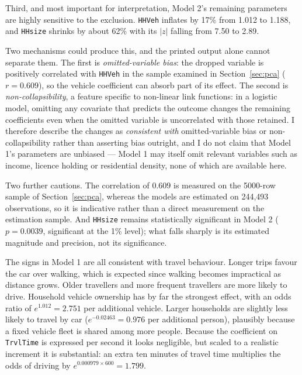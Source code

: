 \documentclass[11pt,a4paper]{article}
\newcommand{\code}[1]{\texttt{#1}}
\begin{document}
Third, and most important for interpretation, Model 2's remaining parameters are highly
sensitive to the exclusion. \code{HHVeh} inflates by 17\% from 1.012 to 1.188, and
\code{HHsize} shrinks by about 62\% with its $|z|$ falling from 7.50 to 2.89.

Two mechanisms could produce this, and the printed output alone cannot separate them. The
first is \emph{omitted-variable bias}: the dropped variable is positively correlated with
\code{HHVeh} in the sample examined in Section~\ref{sec:pca} ($r = 0.609$), so the vehicle
coefficient can absorb part of its effect. The second is \emph{non-collapsibility}, a
feature specific to non-linear link functions: in a logistic model, omitting any covariate
that predicts the outcome changes the remaining coefficients even when the omitted variable
is uncorrelated with those retained. I therefore describe the changes as \emph{consistent
with} omitted-variable bias or non-collapsibility rather than asserting bias outright, and
I do not claim that Model 1's parameters are unbiased --- Model 1 may itself omit relevant
variables such as income, licence holding or residential density, none of which are
available here.

Two further cautions. The correlation of $0.609$ is measured on the 5000-row sample of
Section~\ref{sec:pca}, whereas the models are estimated on 244,493 observations, so it is
indicative rather than a direct measurement on the estimation sample. And \code{HHsize}
remains statistically significant in Model 2 ($p = 0.0039$, significant at the 1\% level);
what falls sharply is its estimated magnitude and precision, not its significance.

The signs in Model 1 are all consistent with travel behaviour. Longer trips favour the car
over walking, which is expected since walking becomes impractical as distance grows. Older
travellers and more frequent travellers are more likely to drive. Household vehicle
ownership has by far the strongest effect, with an odds ratio of $e^{1.012} = 2.751$ per
additional vehicle. Larger households are slightly less likely to travel by car
($e^{-0.02463} = 0.976$ per additional person), plausibly because a fixed vehicle fleet is
shared among more people. Because the coefficient on \code{TrvlTime} is expressed per
second it looks negligible, but scaled to a realistic increment it is substantial: an
extra ten minutes of travel time multiplies the odds of driving by
$e^{0.000979 \times 600} = 1.799$.
\end{document}
